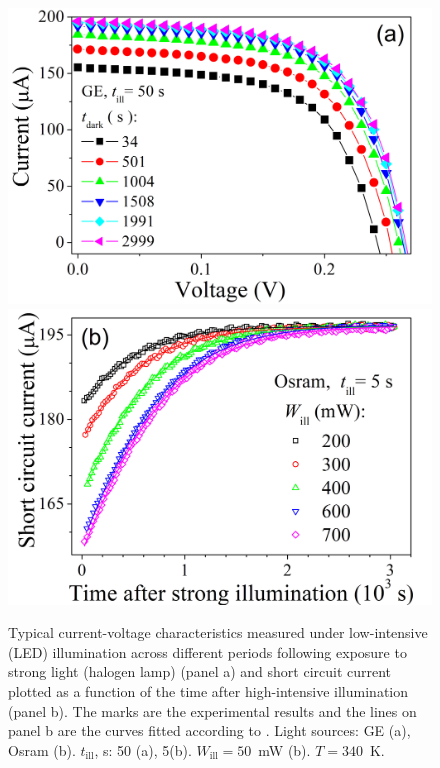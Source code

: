 \documentclass{WileyMSP-template}
\begin{document}
\begin{figure}
\centering
  \includegraphics[width=0.4\linewidth]{Fig2a.png}
  \includegraphics[width=0.4\linewidth]{Fig2b.png}
  \caption{Typical current-voltage characteristics measured
  under low-intensive (LED) illumination across different periods following exposure to strong light (halogen lamp) (panel a) and
  short circuit current plotted as a function of the time after high-intensive illumination (panel b).
  The marks are the experimental results and the lines on panel b are the curves fitted according to \cite{Olikh2022:JMatSci,Olikh2021JAP}.
  Light sources: GE (a), Osram (b).
  $t_\mathrm{ill}$, s: 50 (a), 5(b).
  $W_\mathrm{ill}=50$~mW (b).
  $T=340$~K.}
  \label{fig2}
\end{figure}
\end{document}
